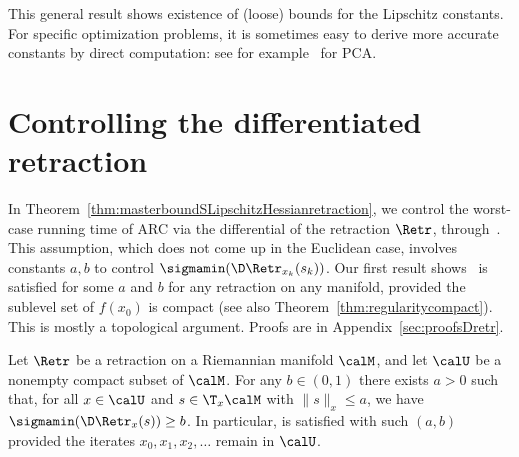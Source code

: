 %


This general result shows existence of (loose) bounds for the Lipschitz constants. For specific optimization problems, it is sometimes easy to derive more accurate constants by direct computation: see for example~\citep[App.~D]{criscitiello2019escapingsaddles} for PCA.





\section{Controlling the differentiated retraction} \label{sec:Dretr}


In Theorem~\ref{thm:masterboundSLipschitzHessianretraction}, we control the worst-case running time of ARC via the differential of the retraction $\Retr$, through~. This assumption, which does not come up in the Euclidean case, involves constants $a, b$ to control $\sigmamin(\D\Retr_{x_k}(s_k))$. Our first result shows~ is satisfied for some $a$ and $b$ for any retraction on any manifold, provided the sublevel set of $f(x_0)$ is compact (see also Theorem~\ref{thm:regularitycompact}). This is mostly a topological argument. Proofs are in Appendix~\ref{sec:proofsDretr}.
\begin{theorem} \label{thm:retractionsgeneralmainnew}
	Let $\Retr$ be a retraction on a Riemannian manifold $\calM$, and let $\calU$ be a nonempty compact subset of $\calM$. For any $b \in (0, 1)$ there exists $a > 0$ such that, for all $x \in \calU$ and $s \in \T_x\calM$ with $\|s\|_x \leq a$, we have $\sigmamin(\D\Retr_x(s)) \geq b$. In particular,  is satisfied with such $(a, b)$ provided the iterates $x_0, x_1, x_2, \ldots$ remain in $\calU$.
\end{theorem}

